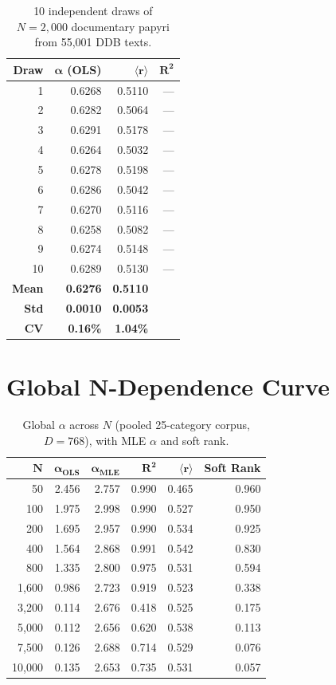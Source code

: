 \documentclass[11pt,letterpaper]{article}
\newcommand{\rbar}{\langle r \rangle}
\newcommand{\al}{\alpha}
\begin{document}
\begin{longtable}{rrrr}
\caption{10 independent draws of $N = 2{,}000$ documentary papyri
from 55{,}001 DDB texts.} \\
\toprule
\textbf{Draw} & $\boldsymbol{\al}$ \textbf{(OLS)} &
$\boldsymbol{\rbar}$ & $\boldsymbol{R^2}$ \\
\midrule
1 & 0.6268 & 0.5110 & --- \\
2 & 0.6282 & 0.5064 & --- \\
3 & 0.6291 & 0.5178 & --- \\
4 & 0.6264 & 0.5032 & --- \\
5 & 0.6278 & 0.5198 & --- \\
6 & 0.6286 & 0.5042 & --- \\
7 & 0.6270 & 0.5116 & --- \\
8 & 0.6258 & 0.5082 & --- \\
9 & 0.6274 & 0.5148 & --- \\
10 & 0.6289 & 0.5130 & --- \\
\midrule
\textbf{Mean} & \textbf{0.6276} & \textbf{0.5110} & \\
\textbf{Std} & \textbf{0.0010} & \textbf{0.0053} & \\
\textbf{CV} & \textbf{0.16\%} & \textbf{1.04\%} & \\
\bottomrule
\end{longtable}


\section{Global N-Dependence Curve}
\label{sec:ndep_full}

\begin{longtable}{rrrrrr}
\caption{Global $\al$ across $N$ (pooled 25-category corpus,
$D = 768$), with MLE $\al$ and soft rank.} \\
\toprule
$\boldsymbol{N}$ & $\boldsymbol{\al_{\text{OLS}}}$ &
$\boldsymbol{\al_{\text{MLE}}}$ & $\boldsymbol{R^2}$ &
$\boldsymbol{\rbar}$ & \textbf{Soft Rank} \\
\midrule
50 & 2.456 & 2.757 & 0.990 & 0.465 & 0.960 \\
100 & 1.975 & 2.998 & 0.990 & 0.527 & 0.950 \\
200 & 1.695 & 2.957 & 0.990 & 0.534 & 0.925 \\
400 & 1.564 & 2.868 & 0.991 & 0.542 & 0.830 \\
800 & 1.335 & 2.800 & 0.975 & 0.531 & 0.594 \\
1{,}600 & 0.986 & 2.723 & 0.919 & 0.523 & 0.338 \\
3{,}200 & 0.114 & 2.676 & 0.418 & 0.525 & 0.175 \\
5{,}000 & 0.112 & 2.656 & 0.620 & 0.538 & 0.113 \\
7{,}500 & 0.126 & 2.688 & 0.714 & 0.529 & 0.076 \\
10{,}000 & 0.135 & 2.653 & 0.735 & 0.531 & 0.057 \\
\bottomrule
\end{longtable}
\end{document}
